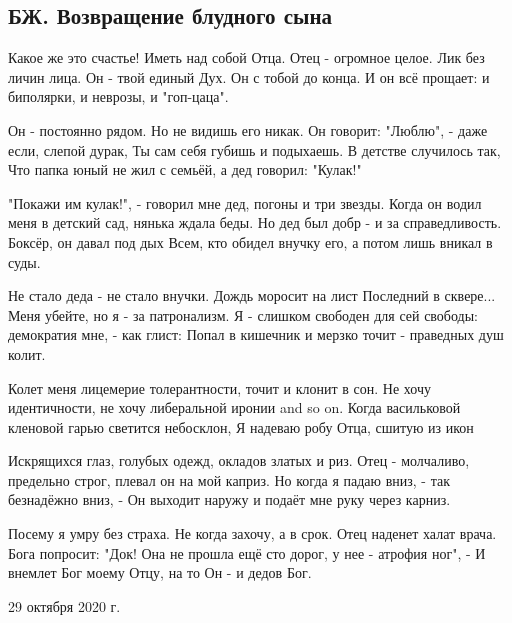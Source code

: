  
 
 

\subsection{БЖ. Возвращение блудного сына}


Какое же это счастье! Иметь над собой Отца.
Отец - огромное целое. Лик без личин лица.
Он - твой единый Дух. Он с тобой до конца.
И он всё прощает: и биполярки, и неврозы, и "гоп-цаца".

Он - постоянно рядом. Но не видишь его никак.
Он говорит: "Люблю", - даже если, слепой дурак,
Ты сам себя губишь и подыхаешь. В детстве случилось так,
Что папка юный не жил с семьёй, а дед говорил: "Кулак!"

"Покажи им кулак!", - говорил мне дед, погоны и три звезды.
Когда он водил меня в детский сад, нянька ждала беды.
Но дед был добр - и за справедливость. Боксёр, он давал под дых
Всем, кто обидел внучку его, а потом лишь вникал в суды.

Не стало деда - не стало внучки. Дождь моросит на лист
Последний в сквере... Меня убейте, но я - за патронализм.
Я - слишком свободен для сей свободы: демократия мне, - как глист:
Попал в кишечник и мерзко точит - праведных душ колит.

Колет меня лицемерие толерантности, точит и клонит в сон.
Не хочу идентичности, не хочу либеральной иронии and so on.
Когда васильковой кленовой гарью светится небосклон,
Я надеваю робу Отца, сшитую из икон

Искрящихся глаз, голубых одежд, окладов златых и риз.
Отец - молчаливо, предельно строг, плевал он на мой каприз.
Но когда я падаю вниз, - так безнадёжно вниз, -
Он выходит наружу и подаёт мне руку через карниз.

Посему я умру без страха. Не когда захочу, а в срок.
Отец наденет халат врача. Бога попросит: "Док!
Она не прошла ещё сто дорог, у нее - атрофия ног", -
И внемлет Бог моему Отцу, на то Он - и дедов Бог.

29 октября 2020 г.
